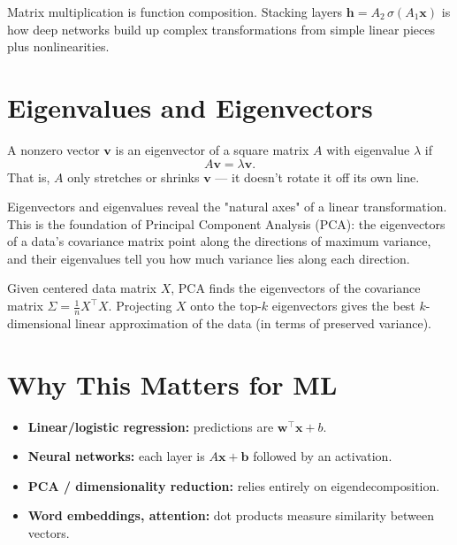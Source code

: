 \begin{keyidea}
Matrix multiplication is function composition. Stacking layers
$\mathbf{h} = A_2\,\sigma(A_1\mathbf{x})$ is how deep networks build up
complex transformations from simple linear pieces plus nonlinearities.
\end{keyidea}

\section{Eigenvalues and Eigenvectors}

\begin{definition}[Eigenvector]
A nonzero vector $\mathbf{v}$ is an eigenvector of a square matrix $A$ with
eigenvalue $\lambda$ if
\[
  A\mathbf{v} = \lambda\mathbf{v}.
\]
That is, $A$ only stretches or shrinks $\mathbf{v}$ — it doesn't rotate it
off its own line.
\end{definition}

Eigenvectors and eigenvalues reveal the "natural axes" of a linear
transformation. This is the foundation of Principal Component Analysis
(PCA): the eigenvectors of a data's covariance matrix point along the
directions of maximum variance, and their eigenvalues tell you how much
variance lies along each direction.


\begin{example}
Given centered data matrix $X$, PCA finds the eigenvectors of the
covariance matrix $\Sigma = \frac{1}{n}X^\top X$. Projecting $X$ onto the
top-$k$ eigenvectors gives the best $k$-dimensional linear approximation of
the data (in terms of preserved variance).
\end{example}

\section{Why This Matters for ML}
\begin{itemize}[leftmargin=*]
  \item \textbf{Linear/logistic regression:} predictions are $\mathbf{w}^\top\mathbf{x} + b$.
  \item \textbf{Neural networks:} each layer is $A\mathbf{x} + \mathbf{b}$ followed by an activation.
  \item \textbf{PCA / dimensionality reduction:} relies entirely on eigendecomposition.
  \item \textbf{Word embeddings, attention:} dot products measure similarity between vectors.
\end{itemize}
